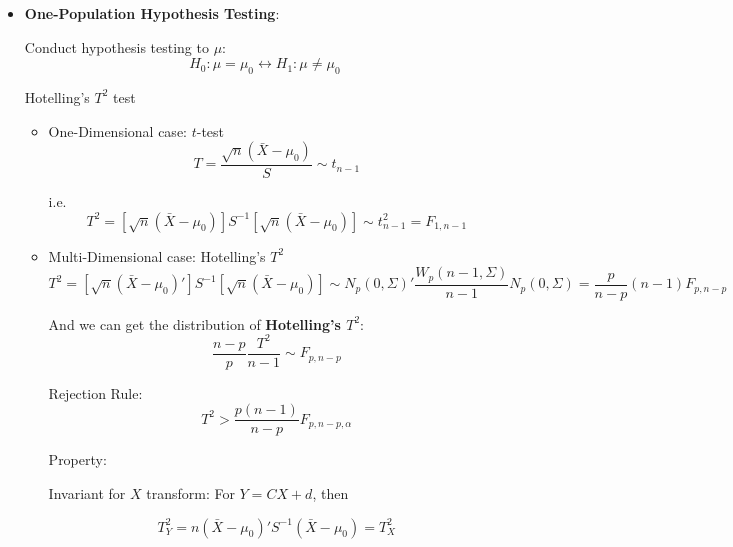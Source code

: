 \begin{itemize}[topsep=2pt,itemsep=2pt]
    \item \textbf{One-Population Hypothesis Testing}: 
    
    Conduct hypothesis testing to $ \mu $:
    \begin{equation}
        H_0: \mu=\mu_0\longleftrightarrow H_1:\mu\neq \mu_0
    \end{equation}

\begin{point}
    Hotelling's $ T^2 $ test
\end{point}

    
    \begin{itemize}[topsep=2pt,itemsep=2pt]
        \item One-Dimensional case: $ t $-test
        \begin{equation}
            T=\dfrac{\sqrt{n}(\bar{X}-\mu_0)}{S}\sim t_{n-1}
        \end{equation}
        
        i.e.
        \begin{equation}
            T^2=[\sqrt{n}(\bar{X}-\mu_0)]S^{-1}[\sqrt{n}(\bar{X}-\mu_0)] \sim t^2_{n-1}=F_{1,n-1}
        \end{equation}


        \item Multi-Dimensional case: Hotelling's $ T^2 $
        \begin{equation}
            T^2 =[\sqrt{n}(\bar{X}-\mu_0)']S^{-1}[\sqrt{n}(\bar{X}-\mu _0)] \sim N_p(0,\Sigma )'\dfrac{W_p(n-1,\Sigma )}{n-1}N_p(0,\Sigma )=\dfrac{p}{n-p}(n-1)F_{p,n-p}
        \end{equation}

        And we can get the distribution of \textbf{Hotelling's $ T^2 $}:
         \begin{equation} \dfrac{n-p}{p}\dfrac{T^2}{n-1}\sim F_{p,n-p} \end{equation}

        Rejection Rule:
        \begin{equation}
            T^2>\dfrac{p(n-1)}{n-p}F_{p,n-p,\alpha } 
        \end{equation}
        
        

        Property:

        Invariant for $ X $ transform: For $ Y=CX+d $, then 
            
            \begin{equation}
                T^2_Y=n(\bar{X}-\mu_0)'S^{-1}(\bar{X}-\mu_0)=T^2_X 
            \end{equation}
    \end{itemize}      
            

\end{itemize}
